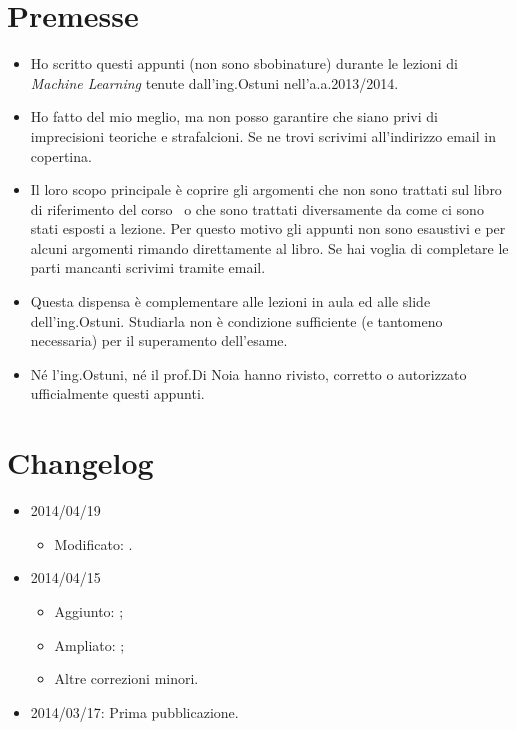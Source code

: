 \section*{Premesse}
\begin{itemize}
\item Ho scritto questi appunti (non sono sbobinature) durante le lezioni di \emph{Machine Learning }tenute dall'ing.\@ Ostuni nell'a.a.\@ 2013/2014. 

\item Ho fatto del mio meglio, ma non posso garantire che siano privi di imprecisioni teoriche e strafalcioni. Se ne trovi scrivimi all'indirizzo email in copertina.

\item Il loro scopo principale è coprire gli argomenti che non sono trattati sul libro di riferimento del corso~\cite{AIMA} o che sono trattati diversamente da come ci sono stati esposti a lezione. Per questo motivo gli appunti non sono esaustivi e per alcuni argomenti rimando direttamente al libro. Se hai voglia di completare le parti mancanti scrivimi tramite email.

\item Questa dispensa è complementare alle lezioni in aula ed alle slide dell'ing.\@  Ostuni. Studiarla non è condizione sufficiente (e tantomeno necessaria) per il superamento dell'esame.

\item Né l'ing.\@  Ostuni, né il prof.\@  Di Noia hanno rivisto, corretto o autorizzato ufficialmente questi appunti.
\end{itemize}

\section*{Changelog}

\begin{itemize}
    
     \item 2014/04/19
     \begin{itemize}
     \item Modificato: .
     \end{itemize}
     
    
    \item 2014/04/15 \begin{itemize}
        \item Aggiunto: ;
        \item Ampliato: ;
        \item Altre correzioni minori.
     \end{itemize}
     
     \item 2014/03/17: Prima pubblicazione.
    
\end{itemize}

